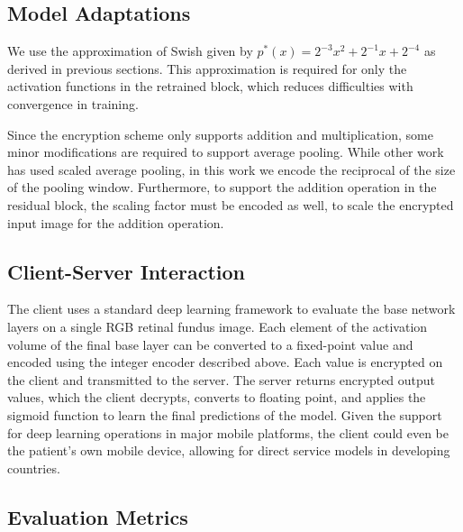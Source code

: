 \documentclass[conference]{IEEEtran}
\begin{document}
\subsection{Model Adaptations}

We use the approximation of Swish \cite{ramachandran2017swish} given by $p^*(x) = 2^{-3}x^2 + 2^{-1}x + 2^{-4}$ as derived in previous sections. This approximation is required for only the activation functions in the retrained block, which reduces difficulties with convergence in training.

Since the encryption scheme only supports addition and multiplication, some minor modifications are required to support average pooling. While other work has used scaled average pooling, in this work we encode the reciprocal of the size of the pooling window. Furthermore, to support the addition operation in the residual block, the scaling factor must be encoded as well, to scale the encrypted input image for the addition operation.


\subsection{Client-Server Interaction}

The client uses a standard deep learning framework to evaluate the base network layers on a single RGB retinal fundus image. Each element of the activation volume of the final base layer can be converted to a fixed-point value and encoded using the integer encoder described above. Each value is encrypted on the client and transmitted to the server. The server returns encrypted output values, which the client decrypts, converts to floating point, and applies the sigmoid function to learn the final predictions of the model. Given the support for deep learning operations in major mobile platforms, the client could even be the patient's own mobile device, allowing for direct service models in developing countries.

\subsection{Evaluation Metrics}\label{eval_metrics}
\end{document}
